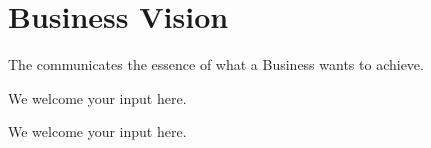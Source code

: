 \section{Business Vision}%
\label{sec:ekg-mm-a-1-1}
\label{sec:ekg-mm-business-vision}

The  communicates the essence of what a Business wants to achieve.

We welcome your input here.

\ekgmmContextSection

We welcome your input here.
